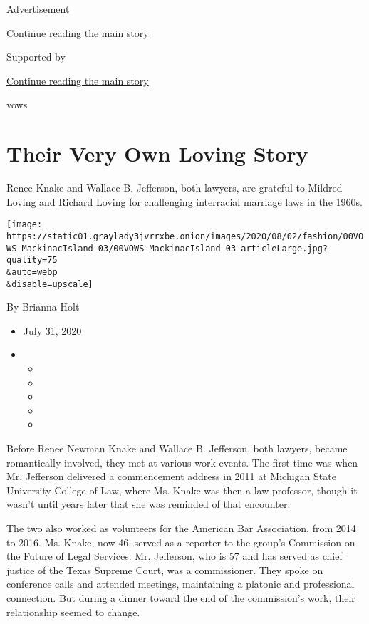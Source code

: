 Advertisement

\protect\hyperlink{after-top}{Continue reading the main story}

Supported by

\protect\hyperlink{after-sponsor}{Continue reading the main story}

vows

\hypertarget{their-very-own-loving-story}{%
\section{Their Very Own Loving
Story}\label{their-very-own-loving-story}}

Renee Knake and Wallace B. Jefferson, both lawyers, are grateful to
Mildred Loving and Richard Loving for challenging interracial marriage
laws in the 1960s.

\texttt{[image: https://static01.graylady3jvrrxbe.onion/images/2020/08/02/fashion/00VOWS-MackinacIsland-03/00VOWS-MackinacIsland-03-articleLarge.jpg?quality=75\\\&auto=webp\\\&disable=upscale]}

By Brianna Holt

\begin{itemize}
\item
  July 31, 2020
\item
  \begin{itemize}
  \item
  \item
  \item
  \item
  \item
  \end{itemize}
\end{itemize}

Before Renee Newman Knake and Wallace B. Jefferson, both lawyers, became
romantically involved, they met at various work events. The first time
was when Mr. Jefferson delivered a commencement address in 2011 at
Michigan State University College of Law, where Ms. Knake was then a law
professor, though it wasn't until years later that she was reminded of
that encounter.

The two also worked as volunteers for the American Bar Association, from
2014 to 2016. Ms. Knake, now 46, served as a reporter to the group's
Commission on the Future of Legal Services. Mr. Jefferson, who is 57 and
has served as chief justice of the Texas Supreme Court, was a
commissioner. They spoke on conference calls and attended meetings,
maintaining a platonic and professional connection. But during a dinner
toward the end of the commission's work, their relationship seemed to
change.

